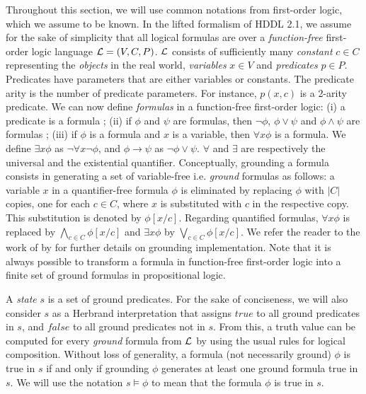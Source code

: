 \documentclass[letterpaper]{article} %
\begin{document}
Throughout this section, we will use common notations from first-order logic, which we assume to be known. In the lifted formalism of HDDL 2.1, we assume for the sake of simplicity that all logical formulas are over a {\it function-free} first-order logic language ${\cal{L}} = (V, C, P)$. ${\cal{L}}$ consists of sufficiently many {\it constant} $c \in C$ representing the {\it objects} in the real world, {\it variables} $x \in V$ and {\it predicates} $p \in P$. Predicates have parameters that are either variables or constants. The predicate arity is the number of predicate parameters. For instance, $p(x, c)$ is a 2-arity predicate. We can now define {\it formulas} in a function-free first-order logic: (i) a predicate is a formula ; (ii) if ${\phi}$ and ${\psi}$ are formulas, then $\neg \phi$, $\phi \vee \psi$ and $\phi \wedge \psi$ are formulas ; (iii) if $\phi$ is a formula and $x$ is a variable, then $\forall x \phi$ is a formula. We define $\exists x \phi$ as $\neg \forall x \neg \phi$, and $\phi \rightarrow \psi$ as $\neg \phi \vee \psi$. $\forall$ and $\exists$ are respectively the universal and the existential quantifier. Conceptually, grounding a formula consists in generating a set of variable-free i.e. {\it ground} formulas \cite{helmert} as follows: a variable $x$ in a quantifier-free formula $\phi$ is eliminated by replacing $\phi$ with $|C|$ copies, one for each $c \in C$, where $x$ is substituted with $c$ in the respective copy. This substitution is denoted by $\phi[x/c]$. Regarding quantified formulas, $\forall x \phi$ is replaced by $\bigwedge_{c \in C} \phi[x/c]$ and $\exists x \phi$ by $\bigvee_{c \in C} \phi[x/c]$. We refer the reader to the work of by \citet{behnke20,ramoul17} for further details on grounding implementation. Note that it is always possible to transform a formula in function-free first-order logic into a finite set of ground formulas in propositional logic.

A {\it state} $s$ is a set of ground predicates. For the sake of conciseness, we will also consider $s$ as a Herbrand interpretation that assigns $true$ to all ground predicates in $s$, and $false$ to all ground predicates not in $s$. From this, a truth value can be computed for every {\it ground} formula from ${\cal{L}}$ by using the usual rules for logical composition.
Without loss of generality, a formula (not necessarily ground) $\phi$ is true in $s$ if and only if grounding $\phi$ generates at least one ground formula true in $s$. We will use the notation $s \models \phi$ to mean that the formula $\phi$ is true in $s$.
\end{document}
